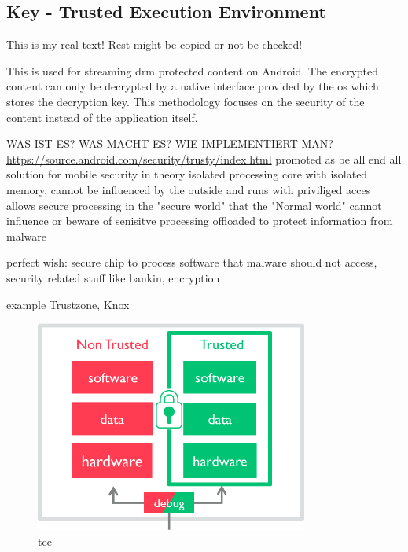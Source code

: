 \subsection{Key - Trusted Execution Environment} \label{section:counter-external-tee}
This is my real text! Rest might be copied or not be checked!

This is used for streaming \gls{drm} protected content on Android.
The encrypted content can only be decrypted by a native interface provided by the \gls{os} which stores the decryption key. \cite{androidDrm}
\newline
This methodology focuses on the security of the content instead of the application itself.

WAS IST ES?
WAS MACHT ES?
WIE IMPLEMENTIERT MAN?
\url{https://source.android.com/security/trusty/index.html}
%
promoted as be all end all solution for mobile security
in theory isolated processing core with isolated memory, cannot be influenced by the outside and runs with priviliged acces
allows secure processing in the "secure world" that the "Normal world" cannot influence or beware of
senisitve processing offloaded to protect information from malware

perfect wish:
secure chip to process software that malware should not access, security related stuff like bankin, encryption

example Trustzone, Knox
\begin{figure}[h]
    \centering
    \includegraphics[width=0.8\textwidth]{data/tee.png}
    \caption{tee \cite{armTz}}
    \label{fig:tee}
\end{figure}


\cite{dragonTZ}\cite{armTz}
%



